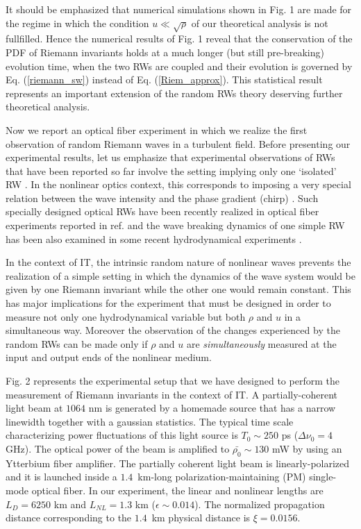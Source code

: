 \documentclass[twocolumn,preprintnumbers,amsmath,amssymb,superscriptaddress]{revtex4}
\begin{document}
It should be emphasized that numerical simulations shown 
in Fig. 1 are made for 
the regime in which the condition $u \ll \sqrt{\rho}$ of 
our theoretical analysis is not fullfilled. 
Hence the numerical results of Fig. 1 reveal that the 
conservation of the PDF of Riemann invariants holds
at a much longer (but still pre-breaking) evolution time, when the two RWs are coupled
and their evolution is governed by Eq. (\ref{riemann_sw}) instead 
of Eq. (\ref{Riem_approx}). 
This statistical result represents an important extension  of the random
RWs theory \cite{gurbatov1991nonlinear} 
deserving further theoretical analysis.

Now we report an optical fiber experiment in which we realize 
the first observation of random Riemann waves in a turbulent field.
Before presenting our experimental results, let us 
emphasize that experimental observations of RWs that have been 
reported so far involve the setting implying only 
one `isolated' RW \cite{Wetzel:16,Trillo:16}. 
In the nonlinear optics context, this corresponds to imposing a 
very special relation between the wave intensity and the phase
gradient (chirp) \cite{Wabnitz:13}. Such specially designed
optical RWs have been recently realized in optical fiber 
experiments reported in ref. \cite{Wetzel:16} and the wave 
breaking dynamics of one simple RW has been also examined 
in some recent hydrodynamical experiments \cite{Trillo:16}. 

In the context of IT, the intrinsic random 
nature of nonlinear waves prevents the realization of a simple
setting in which the dynamics of the wave system would be 
given by one Riemann invariant while the other one would remain 
constant. This has major implications for the experiment that
must be designed in order to measure not only one hydrodynamical 
variable but both $\rho$ and $u$ in a simultaneous 
way. Moreover the observation of the changes experienced by the 
random RWs can be made only if $\rho$ and $u$ are 
{\it simultaneously} measured at the input and output 
ends of the nonlinear  medium. 

Fig. 2 represents the experimental setup that we have designed 
to perform the measurement of Riemann invariants in the context 
of IT. A partially-coherent light beam at
$1064$ nm is generated by a homemade source that has a  narrow
linewidth together with a gaussian statistics.  The typical time scale
characterizing power fluctuations of this light  source is $T_0 \sim
250$ ps ($\Delta \nu_0=4$ GHz). The optical power of the 
beam is amplified to $\bar{\rho_0} \sim 130$ mW by using an
Ytterbium fiber amplifier.  The partially coherent light beam is
linearly-polarized and it is launched inside a $1.4$~km-long
polarization-maintaining (PM) single-mode  optical fiber. 
In our experiment, the linear and nonlinear  lengths are
$L_D=6250$ km and $L_{NL}=1.3$ km ($\epsilon \sim 0.014$). The 
normalized propagation distance corresponding to the $1.4$~km physical 
distance is $\xi=0.0156$.
\end{document}
